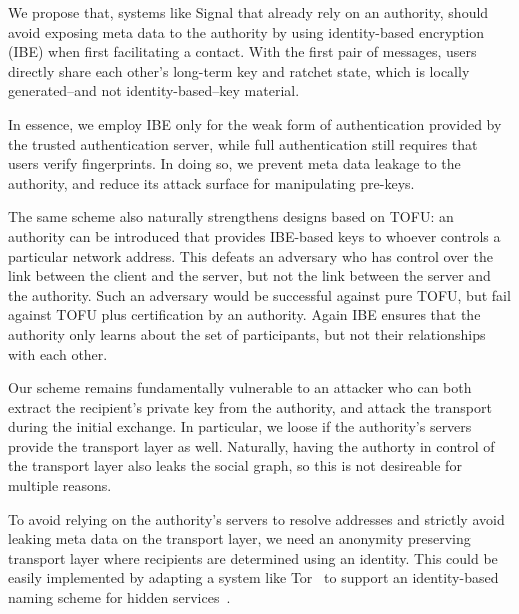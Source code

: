 \documentclass[twoside,letterpaper]{sig-alternate}
\begin{document}

\smallskip

We propose that, systems like Signal that already rely on an authority,
should avoid exposing meta data to the authority by using
identity-based encryption (IBE) when first facilitating a contact.
With the first pair of messages, users directly share each other's
long-term key and ratchet state, which is locally
generated--and not identity-based--key material.

In essence, we employ IBE only for the weak form of authentication provided
by the trusted authentication server,
while full authentication still requires that users verify fingerprints.
In doing so, we prevent meta data leakage to the authority, and reduce
its attack surface for manipulating pre-keys.

The same scheme also naturally strengthens designs based on TOFU:
an authority can be introduced that provides IBE-based keys to
whoever controls a particular network address.  This defeats an
adversary who has control over the link between the client and the
server, but not the link between the server and the authority.
Such an adversary would be successful against pure TOFU, but fail
against TOFU plus certification by an authority.  Again IBE ensures
that the authority only learns about the set of participants, but
not their relationships with each other.

Our scheme remains fundamentally vulnerable to an attacker who can both
extract the recipient's private key from the authority, and
attack the transport during the initial exchange.
In particular, we loose if the authority's servers provide the transport
layer as well.  Naturally, having the authorty in control of the
transport layer also leaks the social graph, so this is not desireable
for multiple reasons.

To avoid relying on the authority's servers to resolve addresses and
strictly avoid leaking meta data on the transport layer, we need an
anonymity preserving transport layer where recipients are determined
using an identity.  This could be easily implemented by adapting a
system like Tor~\cite{tor} to support an identity-based naming scheme
for hidden services~\cite{hidden}.
\end{document}
